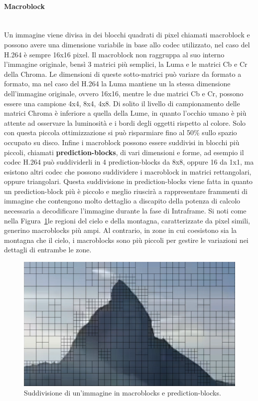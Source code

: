 \documentclass[a4paper,12pt, oneside]{article}
\begin{document}
\paragraph{Macroblock}\hphantom{A}\\
Un immagine viene divisa in dei blocchi quadrati di pixel chiamati macroblock e possono avere una
dimensione variabile in base allo codec utilizzato, nel caso del H.264 è sempre 16x16 pixel. Il
macroblock non raggruppa al suo interno l'immagine originale, bensì 3 matrici più semplici, la
Luma e le matrici Cb e Cr della Chroma. Le dimensioni di queste sotto-matrici può variare da
formato a formato, ma nel caso del H.264 la Luma mantiene un la stessa dimensione dell'immagine
originale, ovvero 16x16, mentre le due matrici Cb e Cr, possono essere una campione 4x4, 8x4, 4x8.
Di solito il livello di campionamento delle matrici Chroma è inferiore a quella della Lume, in quanto
l'occhio umano è più attente ad osservare la luminosità e i bordi degli oggetti rispetto al colore.
Solo con questa piccola ottimizzazione si può risparmiare fino al 50\% sullo spazio occupato su disco.
Infine i macroblock possono essere suddivisi in blocchi più piccoli, chiamati
\textbf{prediction-blocks}, di vari dimensioni e forme, ad esempio il codec H.264 può suddividerli in
4 prediction-blocks da 8x8, oppure 16 da 1x1, ma esistono altri codec che possono suddividere i
macroblock in matrici rettangolari, oppure triangolari. Questa suddivisione in prediction-blocks
viene fatta in quanto un prediction-block più è piccolo e meglio riuscirà a rappresentare frammenti
di immagine che contengono molto dettaglio a discapito della potenza di calcolo necessaria a
decodificare l'immagine durante la fase di Intraframe. Si noti come nella
Figura~\ref{fig:macroblocks_sub_division}le regioni del cielo e della montagna, caratterizzate da
pixel simili, generino macroblocks più ampi. Al contrario, in zone in cui coesistono sia la montagna
che il cielo, i macroblocks sono più piccoli per gestire le variazioni nei dettagli di entrambe le
zone.

\begin{figure}[h]
    \centering
    \includegraphics[width=1\textwidth]{images/macroblocks_sub-division.png}
    \caption{Suddivisione di un'immagine in macroblocks e prediction-blocks.}
    \label{fig:macroblocks_sub_division}
\end{figure}
\end{document}
